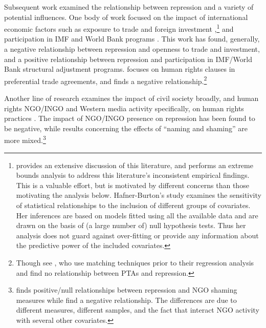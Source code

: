 \documentclass[12pt]{article}
\begin{document}
Subsequent work examined the relationship between repression and a variety of potential influences. One body of work focused on the impact of international economic factors such as exposure to trade and foreign investment \citep{Apodaca2001, RichardsGellenySacko2001, HafnerBurton2005jpr},\footnote{\citet{HafnerBurton2005jpr} provides an extensive discussion of this literature, and performs an extreme bounds analysis \citep{LeamerLeonard1983} to address this literature's inconsistent empirical findings. This is a valuable effort, but is motivated by different concerns than those motivating the analysis below. Hafner-Burton's study examines the sensitivity of statistical relationships to the inclusion of different groups of covariates. Her inferences are based on models fitted using all the available data and are drawn on the basis of (a large number of) null hypothesis tests. Thus her analysis does not guard against over-fitting or provide any information about the predictive power of the included covariates.} and participation in IMF and World Bank programs \citep{AbouharbCingranelli2006, AbouharbCingranelli2007}. This work has found, generally, a negative relationship between repression and openness to trade and investment, and a positive relationship between repression and participation in IMF/World Bank structural adjustment programs. \citet{HafnerBurton2005io} focuses on human rights clauses in preferential trade agreements, and finds a negative relationship.\footnote{Though see \citet{SpilkerBohmelt2012}, who use matching techniques prior to their regression analysis and find no relationship between PTAs and repression.} 

Another line of research examines the impact of civil society broadly, and human rights NGO/INGO and Western media activity specifically, on human rights practices \citep{HafnerBurtonTsutsui2005,HafnerBurton2008,MurdieDavis2012}. The impact of NGO/INGO presence on repression has been found to be negative, while results concerning the effects of ``naming and shaming'' are more mixed.\footnote{\citet{HafnerBurton2008} finds positive/null relationships between repression and NGO shaming measures while \citet{MurdieDavis2012} find a negative relationship. The differences are due to different measures, different samples, and the fact that \citet{MurdieDavis2012} interact NGO activity with several other covariates.} 
\end{document}
